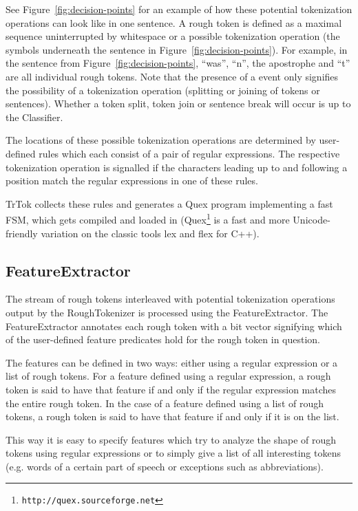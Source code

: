 See Figure~\ref{fig:decision-points} for an example of how these
potential tokenization operations can look like in one sentence. A
rough token is defined as a maximal sequence uninterrupted by
whitespace or a possible tokenization operation (the symbols
underneath the sentence in Figure~\ref{fig:decision-points}). For
example, in the sentence from Figure~\ref{fig:decision-points},
``was'', ``n'', the apostrophe and ``t'' are all individual rough
tokens. Note that the presence of a \may{} event only signifies the
possibility of a tokenization operation (splitting or joining of
tokens or sentences). Whether a token split, token join or sentence
break will occur is up to the Classifier.

The locations of these possible tokenization operations are determined
by user-defined rules which each consist of a pair of regular
expressions. The respective tokenization operation is signalled if the
characters leading up to and following a position match the regular
expressions in one of these rules.

TrTok collects these rules and generates a Quex program implementing a
fast FSM, which gets compiled and loaded in
(Quex\footnote{\texttt{http://quex.sourceforge.net}} is a fast and
more Unicode-friendly variation on the classic tools lex and flex for
C++).

\subsection{FeatureExtractor}

The stream of rough tokens interleaved with potential tokenization
operations output by the RoughTokenizer is processed using the
FeatureExtractor. The FeatureExtractor annotates each rough token with
a bit vector signifying which of the user-defined feature predicates
hold for the rough token in question.

The features can be defined in two ways: either using a regular
expression or a list of rough tokens. For a feature defined using a
regular expression, a rough token is said to have that feature if and
only if the regular expression matches the entire rough token. In the
case of a feature defined using a list of rough tokens, a rough token
is said to have that feature if and only if it is on the list.

This way it is easy to specify features which try to analyze the shape
of rough tokens using regular expressions or to simply give a list of
all interesting tokens (e.g. words of a certain part of speech or
exceptions such as abbreviations).

